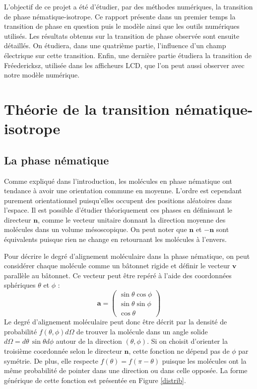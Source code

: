 \documentclass[11pt,a4paper]{article}
\numberwithin{equation}{section}
\begin{document}
L'objectif de ce projet a été d'étudier, par des méthodes numériques, la transition de phase nématique-isotrope. Ce rapport présente dans un premier temps la transition de phase en question puis le modèle ainsi que les outils numériques utilisés. Les résultats obtenus sur la transition de phase observée sont ensuite détaillés. On étudiera, dans une quatrième partie, l'influence d'un champ électrique sur cette transition. Enfin, une dernière partie étudiera la transition de Fréedericksz, utilisée dans les afficheurs LCD, que l'on peut aussi observer avec notre modèle numérique.

\newpage
\section{Théorie de la transition nématique-isotrope}
\subsection{La phase nématique}
Comme expliqué dans l'introduction, les molécules en phase nématique ont tendance à avoir une orientation commune en moyenne. L'ordre est cependant purement orientationnel puisqu'elles occupent des positions aléatoires dans l'espace. Il est possible d’étudier théoriquement ces phases en définissant le directeur $\bm{n}$, comme le vecteur unitaire donnant la direction moyenne des molécules dans un volume mésoscopique. On peut noter que $\bm{n}$ et $-\bm{n}$ sont équivalents puisque rien ne change en retournant les molécules à l'envers.
\medskip

Pour décrire le degré d'alignement moléculaire dans la phase nématique, on peut considérer chaque molécule comme un bâtonnet rigide et définir le vecteur $\bm{v}$ parallèle au bâtonnet. Ce vecteur peut être repéré à l'aide des coordonnées sphériques $\theta$ et $\phi$ :
\begin{equation}
\bm{a} =
\begin{pmatrix}
 \sin \theta \cos \phi \\
 \sin \theta \sin \phi \\
 \cos \theta 
 \end{pmatrix} 
\end{equation}
Le degré d'alignement moléculaire peut donc être décrit par la densité de probabilité $f(\theta,\phi)d\Omega$ de trouver la molécule dans un angle solide $d\Omega = d\theta\, \sin \theta d\phi$ autour de la direction $(\theta,\phi)$. Si on choisit d'orienter la troisième coordonnée selon le directeur $\bm{n}$, cette fonction ne dépend pas de $\phi$ par symétrie. De plus, elle respecte $f(\theta) = f(\pi - \theta)$ puisque les molécules ont la même probabilité de pointer dans une direction ou dans celle opposée. La forme générique de cette fonction est présentée en Figure \ref{distrib}.
\end{document}
